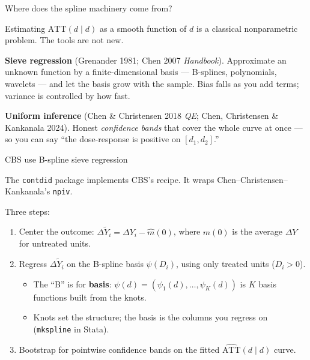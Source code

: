 \documentclass[aspectratio=169,12pt,t]{beamer}
\begin{document}
\begin{frame}{Where does the spline machinery come from?}
\vspace{0.3em}

Estimating $\text{ATT}(d \mid d)$ as a smooth function of $d$ is a classical nonparametric problem. \;The tools are not new.

\vspace{0.6em}

\textbf{Sieve regression} (Grenander 1981; Chen 2007 \textit{Handbook}). \;Approximate an unknown function by a finite-dimensional basis --- B-splines, polynomials, wavelets --- and let the basis grow with the sample. \;Bias falls as you add terms; variance is controlled by how fast.

\vspace{0.6em}

\textbf{Uniform inference} (Chen \& Christensen 2018 \textit{QE}; Chen, Christensen \& Kankanala 2024). \;Honest \textit{confidence bands} that cover the whole curve at once --- so you can say ``the dose-response is positive on $[d_1, d_2]$.''

\vspace{0.5em}
\begin{center}
\end{center}
\end{frame}

\begin{frame}{CBS use B-spline sieve regression}
\vspace{0.6em}

The \texttt{contdid} package implements CBS's recipe. \;It wraps Chen--Christensen--Kankanala's \texttt{npiv}.

\vspace{0.6em}

Three steps:
\begin{enumerate}\setlength\itemsep{0.25em}\footnotesize
  \item Center the outcome: \;$\Delta\tilde Y_i = \Delta Y_i - \widehat m(0)$, \;where $\widehat m(0)$ is the average $\Delta Y$ for untreated units.
  \item Regress $\Delta\tilde Y_i$ on the B-spline basis $\psi(D_i)$, \;using only treated units ($D_i > 0$).
  \begin{itemize}\setlength\itemsep{0.1em}
    \item The ``B'' is for \textbf{basis}: \;$\psi(d) = (\psi_1(d), \ldots, \psi_K(d))$ is $K$ basis functions built from the knots.
    \item Knots set the structure; the basis is the columns you regress on (\texttt{mkspline} in Stata).
  \end{itemize}
  \item Bootstrap for pointwise confidence bands on the fitted $\widehat{\text{ATT}}(d \mid d)$ curve.
\end{enumerate}
\end{frame}
\end{document}
